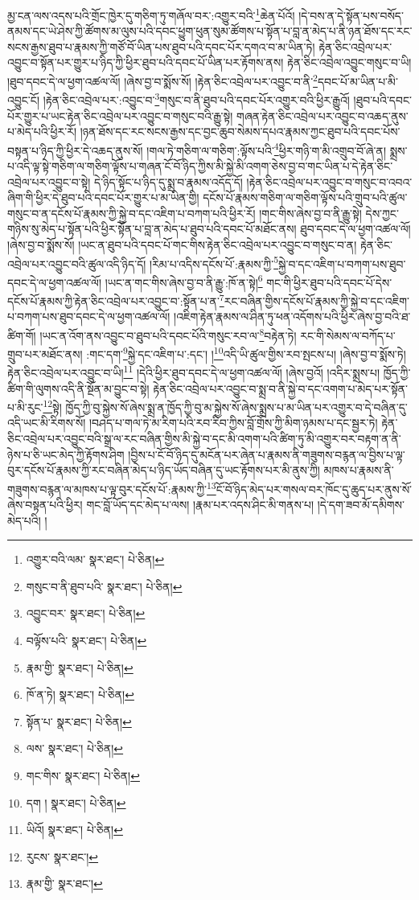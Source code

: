 མྱ་ངན་ལས་འདས་པའི་གྲོང་ཁྱེར་དུ་གཅིག་ཏུ་གཞོལ་བར་:འགྱུར་བའི་\footnote{འགྱུར་བའི་ལམ་  སྣར་ཐང་།  པེ་ཅིན། }ཆེན་པོའོ། །དེ་བས་ན་དེ་སྟོན་པས་བསོད་ནམས་དང་ཡེ་ཤེས་ཀྱི་ཚོགས་མ་ལུས་པའི་དབང་ཕྱུག་ཕུན་སུམ་ཚོགས་པ་སྟོན་པ་བླ་ན་མེད་པ་ནི་ཉན་ཐོས་དང་རང་སངས་རྒྱས་ཐུབ་པ་རྣམས་ཀྱི་གཙོ་བོ་ཡིན་པས་ཐུབ་པའི་དབང་པོར་དགའ་བ་མ་ཡིན་ཏེ། རྟེན་ཅིང་འབྲེལ་པར་འབྱུང་བ་སྟོན་པར་གྱུར་པ་ཉིད་ཀྱི་ཕྱིར་ཐུབ་པའི་དབང་པོ་ཡིན་པར་རྟོགས་ནས། རྟེན་ཅིང་འབྲེལ་འབྱུང་གསུང་བ་ཡི། །ཐུབ་དབང་དེ་ལ་ཕྱག་འཚལ་ལོ། །ཞེས་བྱ་བ་སྨོས་སོ། །རྟེན་ཅིང་འབྲེལ་པར་འབྱུང་བ་ནི་\footnote{གསུང་བ་ནི་ཐུབ་པའི་  སྣར་ཐང་།  པེ་ཅིན། }དབང་པོ་མ་ཡིན་པ་མི་འབྱུང་ངོ། །རྟེན་ཅིང་འབྲེལ་པར་:འབྱུང་བ་\footnote{འབྱུང་བར་  སྣར་ཐང་།  པེ་ཅིན། }གསུང་བ་ནི་ཐུབ་པའི་དབང་པོར་འགྱུར་བའི་ཕྱིར་རྒྱུའོ། །ཐུབ་པའི་དབང་པོར་གྱུར་པ་ཡང་རྟེན་ཅིང་འབྲེལ་པར་འབྱུང་བ་གསུང་བའི་རྒྱུ་སྟེ། གཞན་རྟེན་ཅིང་འབྲེལ་པར་འབྱུང་བ་འཆད་ནུས་པ་མེད་པའི་ཕྱིར་རོ། །ཉན་ཐོས་དང་རང་སངས་རྒྱས་དང་བྱང་ཆུབ་སེམས་དཔའ་རྣམས་ཀྱང་ཐུབ་པའི་དབང་པོས་བསྟན་པ་ཉིད་ཀྱི་ཕྱིར་དེ་འཆད་ནུས་སོ། །གལ་ཏེ་གཅིག་ལ་གཅིག་:ལྟོས་པའི་\footnote{བལྟོས་པའི་  སྣར་ཐང་།  པེ་ཅིན། }ཕྱིར་གཉི་ག་མི་འགྲུབ་བོ་ཞེ་ན། སྨྲས་པ་འདི་ལྟ་སྟེ་གཅིག་ལ་གཅིག་ལྟོས་པ་གཞན་ངོ་བོ་ཉིད་ཀྱིས་མི་སྐྱེ་མི་འགག་ཅེས་བྱ་བ་གང་ཡིན་པ་དེ་རྟེན་ཅིང་འབྲེལ་པར་འབྱུང་བ་སྟེ། དེ་ཉིད་སྟོང་པ་ཉིད་དུ་སྨྲ་བ་རྣམས་འདོད་དོ། །རྟེན་ཅིང་འབྲེལ་པར་འབྱུང་བ་གསུང་བ་འབའ་ཞིག་གི་ཕྱིར་དེ་ཐུབ་པའི་དབང་པོར་གྱུར་པ་མ་ཡིན་གྱི། དངོས་པོ་རྣམས་གཅིག་ལ་གཅིག་ལྟོས་པའི་གྲུབ་པའི་ཚུལ་གསུང་བ་ན་དངོས་པོ་རྣམས་ཀྱི་སྐྱེ་བ་དང་འཇིག་པ་བཀག་པའི་ཕྱིར་རོ། །གང་གིས་ཞེས་བྱ་བ་ནི་རྒྱུ་སྟེ། དེས་ཀྱང་གཉིས་སུ་མེད་པ་སྟོན་པའི་ཕྱིར་སྟོན་པ་བླ་ན་མེད་པ་ཐུབ་པའི་དབང་པོ་མཐོང་ནས། ཐུབ་དབང་དེ་ལ་ཕྱག་འཚལ་ལོ། །ཞེས་བྱ་བ་སྨོས་སོ། །ཡང་ན་ཐུབ་པའི་དབང་པོ་གང་གིས་རྟེན་ཅིང་འབྲེལ་པར་འབྱུང་བ་གསུང་བ་ན། རྟེན་ཅིང་འབྲེལ་པར་འབྱུང་བའི་ཚུལ་འདི་ཉིད་དོ། །རིམ་པ་འདིས་དངོས་པོ་:རྣམས་ཀྱི་\footnote{རྣམ་གྱི་  སྣར་ཐང་།  པེ་ཅིན། }སྐྱེ་བ་དང་འཇིག་པ་བཀག་པས་ཐུབ་དབང་དེ་ལ་ཕྱག་འཚལ་ལོ། །ཡང་ན་གང་གིས་ཞེས་བྱ་བ་ནི་རྒྱུ་:ཁོ་ན་སྟེ།\footnote{ཁོ་ན་ཏེ།  སྣར་ཐང་།  པེ་ཅིན། } གང་གི་ཕྱིར་ཐུབ་པའི་དབང་པོ་དེས་དངོས་པོ་རྣམས་ཀྱི་རྟེན་ཅིང་འབྲེལ་པར་འབྱུང་བ་:སྟོན་པ་ན་\footnote{སྟོན་པ་  སྣར་ཐང་།  པེ་ཅིན། }རང་བཞིན་གྱིས་དངོས་པོ་རྣམས་ཀྱི་སྐྱེ་བ་དང་འཇིག་པ་བཀག་པས་ཐུབ་དབང་དེ་ལ་ཕྱག་འཚལ་ལོ། །འཇིག་རྟེན་རྣམས་ལ་ཤིན་ཏུ་ཕན་འདོགས་པའི་ཕྱིར་ཞེས་བྱ་བའི་ཐ་ཚིག་གོ། །ཡང་ན་འོག་ནས་འབྱུང་བ་ཐུབ་པའི་དབང་པོའི་གསུང་རབ་ལ་\footnote{ལས་  སྣར་ཐང་།  པེ་ཅིན། }བརྟེན་ཏེ། རང་གི་སེམས་ལ་བཀོད་པ་གྲུབ་པར་མཐོང་ནས། :གང་དག་\footnote{གང་གིས་  སྣར་ཐང་།  པེ་ཅིན། }སྐྱེ་དང་འཇིག་པ་:དང་། །\footnote{དག །  སྣར་ཐང་།  པེ་ཅིན། }འདི་ཡི་ཚུལ་གྱིས་རབ་སྤངས་པ། །ཞེས་བྱ་བ་སྨོས་ཏེ། རྟེན་ཅིང་འབྲེལ་པར་འབྱུང་བ་ཡི།\footnote{ཡིའོ།  སྣར་ཐང་།  པེ་ཅིན། } །དེའི་ཕྱིར་ཐུབ་དབང་དེ་ལ་ཕྱག་འཚལ་ལོ། །ཞེས་བྱའོ། །འདིར་སྨྲས་པ། ཁྱོད་ཀྱི་ཚིག་གི་ལུགས་འདི་ནི་སྔོན་མ་བྱུང་བ་སྟེ། རྟེན་ཅིང་འབྲེལ་པར་འབྱུང་བ་སྨྲ་བ་ནི་སྐྱེ་བ་དང་འགག་པ་མེད་པར་སྟོན་པ་མི་རུང་\footnote{རུངས་  སྣར་ཐང་། }སྟེ། ཁྱོད་ཀྱི་བུ་སྐྱེས་སོ་ཞེས་སྨྲ་ན་ཁྱོད་ཀྱི་བུ་མ་སྐྱེས་སོ་ཞེས་སྨྲས་པ་མ་ཡིན་པར་འགྱུར་བ་དེ་བཞིན་དུ་འདི་ཡང་མི་རིགས་སོ། །བཤད་པ་གལ་ཏེ་མ་རིག་པའི་རབ་རིབ་ཀྱིས་བློ་གྲོས་ཀྱི་མིག་ཉམས་པ་དང་སྦྱར་ཏེ། རྟེན་ཅིང་འབྲེལ་པར་འབྱུང་བའི་སྒྲ་ལ་རང་བཞིན་གྱིས་མི་སྐྱེ་བ་དང་མི་འགག་པའི་ཚིག་ཏུ་མི་འགྱུར་བར་བརྟག་ན་ནི་ཉེས་པ་ཅི་ཡང་མེད་ཀྱི་རྟོགས་ཤིག །བྱིས་པ་ངོ་བོ་ཉིད་དུ་མངོན་པར་ཞེན་པ་རྣམས་ནི་གཟུགས་བརྙན་ལ་བྱིས་པ་ལྟ་བུར་དངོས་པོ་རྣམས་ཀྱི་རང་བཞིན་མེད་པ་ཉིད་ཡོད་བཞིན་དུ་ཡང་རྟོགས་པར་མི་ནུས་ཀྱི། མཁས་པ་རྣམས་ནི་གཟུགས་བརྙན་ལ་མཁས་པ་ལྟ་བུར་དངོས་པོ་:རྣམས་ཀྱི་\footnote{རྣམ་གྱི་  སྣར་ཐང་། }ངོ་བོ་ཉིད་མེད་པར་གསལ་བར་ཁོང་དུ་ཆུད་པར་ནུས་སོ་ཞེས་བསྟན་པའི་ཕྱིར། གང་བློ་ཡོད་དང་མེད་པ་ལས། །རྣམ་པར་འདས་ཤིང་མི་གནས་པ། །དེ་དག་ཟབ་མོ་དམིགས་མེད་པའི། །
